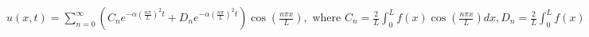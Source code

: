  $u(x,t) = \sum_{n=0}^{\infty} \left( C_n e^{-\alpha \left(\frac{n\pi}{L}\right)^2 t} + D_n e^{-\alpha \left(\frac{n\pi}{L}\right)^2 t} \right) \cos\left(\frac{n\pi x}{L}\right), \text{ where } C_n = \frac{2}{L} \int_0^L f(x) \cos\left(\frac{n\pi x}{L}\right) dx, D_n = \frac{2}{L} \int_0^L f(x) \sin\left(\frac{n\pi x}{L}\right) dx, \text{ and } f(x) = u(x,0) = \sum_{n=0}^{\infty} \left(C_n \cos\left(\frac{n\pi x}{L}\right) + D_n \sin\left(\frac{n\pi x}{L}\right)\right)$